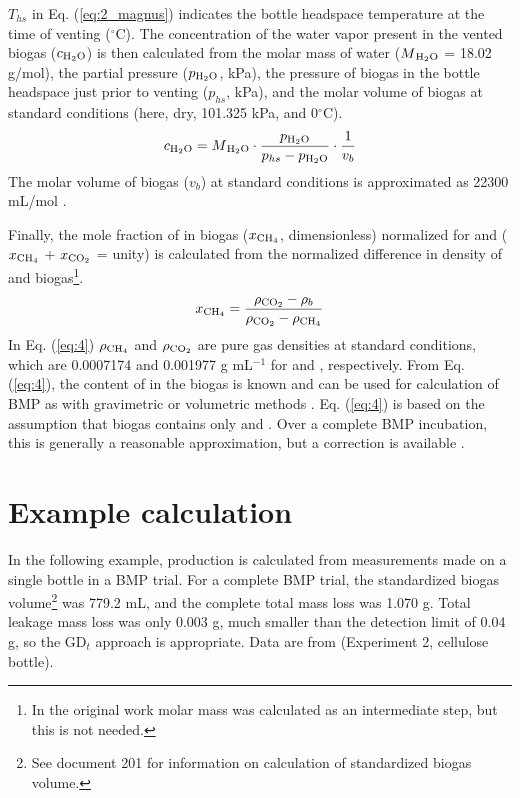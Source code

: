 \documentclass[]{article}
\begin{document}
$T_{hs}$ in Eq. (\ref{eq:2_magnus}) indicates the bottle headspace temperature at the time of venting ($^\circ$C). 
The concentration of the water vapor present in the vented biogas ($c\textsubscript{H$_2$O}$) is then calculated from the molar mass of water ($M\textsubscript{H$_2$O}$ = 18.02 g/mol), the partial pressure ($p\textsubscript{H$_2$O}$, kPa), the pressure of biogas in the bottle headspace just prior to venting ($p_{hs}$, kPa), and the molar volume of biogas at standard conditions (here, dry, 101.325 kPa, and 0$^\circ$C).
\begin{equation}
  \label{eq:3}
  c\textsubscript{H$_2$O}=M\textsubscript{H$_2$O} \cdot \frac{p\textsubscript{H$_2$O}}{p_{hs} - p\textsubscript{H$_2$O}} \cdot \frac{1}{v_b}
\end{equation}
The molar volume of biogas ($v_b$) at standard conditions is approximated as 22300 mL/mol \citep{hafnerValidationSimpleGravimetric2015}.

Finally, the mole fraction of  in biogas ($x\textsubscript{CH$_4$}$, dimensionless) normalized for  and  ($x\textsubscript{CH$_4$}$ + $x\textsubscript{CO$_2$}$ = unity) is calculated from the normalized difference in density of  and biogas\footnote{
  In the original work \citep{justesenDevelopmentValidationLowcost2019} molar mass was calculated as an intermediate step, but this is not needed.
}.
\begin{equation}
  \label{eq:4}
  x\textsubscript{CH$_4$}=\frac{\rho\textsubscript{CO$_2$} - \rho_b}{\rho\textsubscript{CO$_2$}-\rho\textsubscript{CH$_4$}}
\end{equation}
In Eq. (\ref{eq:4}) $\rho\textsubscript{CH$_4$}$ and $\rho\textsubscript{CO$_2$}$ are pure gas densities at standard conditions, which are 0.0007174 and 0.001977 g mL$^{-1}$ for  and , respectively.
From Eq. (\ref{eq:4}), the content of  in the biogas is known and can be used for calculation of BMP as with gravimetric or volumetric methods \citep{hafnerValidationSimpleGravimetric2015}. 
Eq. (\ref{eq:4}) is based on the assumption that biogas contains only  and .
Over a complete BMP incubation, this is generally a reasonable approximation, but a correction is available \citep{justesenDevelopmentValidationLowcost2019}.

\section{Example calculation} \label{s_example}
In the following example,  production is calculated from measurements made on a single bottle in a BMP trial.
For a complete BMP trial, the standardized biogas volume\footnote{
  See document 201 \citep{BMPdoc201vol} for information on calculation of standardized biogas volume.
} was 779.2 mL, and the complete total mass loss was 1.070 g.
Total leakage mass loss was only 0.003 g, much smaller than the detection limit of 0.04 g, so the GD$_t$ approach is appropriate.
Data are from \citet{justesenDevelopmentValidationLowcost2019} (Experiment 2, cellulose bottle).
\end{document}
